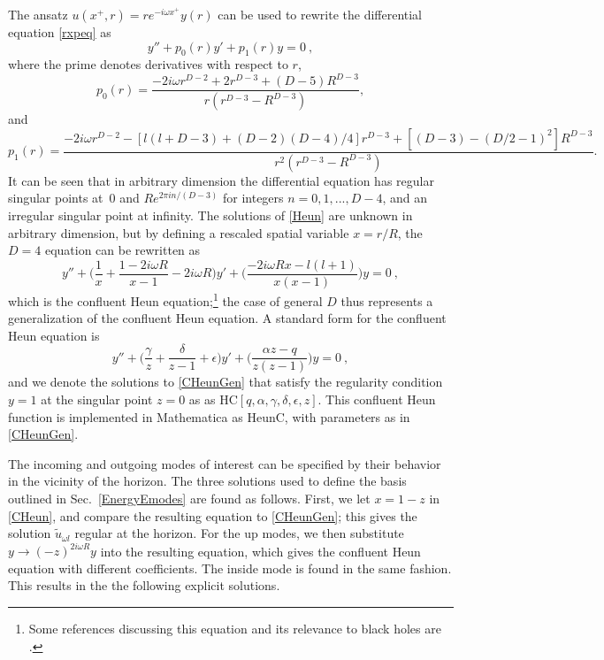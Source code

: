 \documentclass[12pt]{article}
\numberwithin{equation}{section}
\newcommand{\beq}{\begin{equation}}
\newcommand{\eeq}{\end{equation}}
\begin{document}
The ansatz $u(x^+, r) = r e^{-i \omega x^+} y(r)$ can be used to rewrite the differential equation \eqref{rxpeq} as 
\beq\label{Heun}
y''+p_0(r)y'+ p_1(r)y = 0\ ,
\eeq
where the prime denotes derivatives with respect to $r$,
\beq
p_0(r) = \frac{-2 i \omega r^{D-2}+2r^{D-3}+(D-5)R^{D-3}}{r(r^{D-3}-R^{D-3})},
\eeq
and
\beq
p_1(r)=\frac{-2 i \omega r^{D-2}-\left[ l(l+D-3)  + (D-2)(D-4)/4\right]r^{D-3} + \left[(D-3)-(D/2-1)^2\right] R^{D-3}}
{r^2(r^{D-3}-R^{D-3})}.
\eeq
It can be seen that in arbitrary dimension the differential equation has regular singular points at~$0$ and $R e^{2 \pi i n/ (D-3)}$ for integers $n = 0, 1,..., D-4$, and an irregular singular point at infinity. The solutions of \eqref{Heun} are unknown in arbitrary dimension, but by defining a rescaled spatial variable $x = r/R$, the $D=4$ equation can be rewritten  as
\beq\label{CHeun}
y''+\Big(\frac{1}{x}+\frac{1-2 i \omega R}{x-1}-2 i \omega R\Big)y'+ \Big(\frac{-2i \omega R x-l(l+1)}{x(x-1)}\Big)y = 0\ ,
\eeq
which is the confluent Heun equation;\footnote{Some references discussing this equation and its relevance to black holes are \cite{Leav,Fizi1,Fizi2,PhPe}.}  the case of general $D$ thus represents a generalization of the confluent Heun equation.  A standard form for the confluent Heun equation is
\beq\label{CHeunGen}
y''+\Big(\frac{\gamma}{z}+\frac{\delta}{z-1}+\epsilon\Big)y'+ \Big(\frac{\alpha z-q}{z(z-1)}\Big)y = 0\ ,
\eeq
and we denote the solutions to \eqref{CHeunGen} that satisfy the  regularity condition $y= 1$ at the singular point $z=0$ as 
as $\mathrm{HC}[q, \alpha, \gamma, \delta, \epsilon, z]$.  This confluent Heun function is  implemented in Mathematica as $\mathrm{HeunC}$, with  parameters as in \eqref{CHeunGen}. 

The incoming and outgoing modes of interest can be specified by their behavior in the vicinity of the horizon. The three solutions  used to define the basis outlined in 
Sec.~\ref{EnergyEmodes} are found as follows.  First, we let $x=1-z$ in \eqref{CHeun}, and compare the resulting equation to \eqref{CHeunGen}; this gives the solution $\tilde u_{\omega l}$ regular at the horizon.  For the up modes, we then substitute $y\rightarrow (-z)^{2i\omega R} y$ into the resulting equation, which gives the confluent Heun equation with different coefficients.  The inside mode is found in the same fashion.  This results in the the following explicit solutions.
\end{document}
